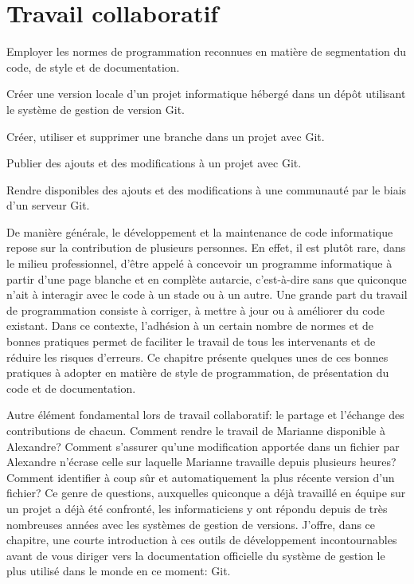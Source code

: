
\chapter{Travail collaboratif}
\label{chap:collaboration}

\begin{objectifs}
\item Employer les normes de programmation reconnues en matière de
  segmentation du code, de style et de documentation.
\item Créer une version locale d'un projet informatique hébergé dans
  un dépôt utilisant le système de gestion de version Git.
\item Créer, utiliser et supprimer une branche dans un projet avec
  Git.
\item Publier des ajouts et des modifications à un projet avec Git.
\item Rendre disponibles des ajouts et des modifications à une
  communauté par le biais d'un serveur Git.
\end{objectifs}

De manière générale, le développement et la maintenance de code
informatique repose sur la contribution de plusieurs personnes. En
effet, il est plutôt rare, dans le milieu professionnel, d'être appelé
à concevoir un programme informatique à partir d'une page blanche et
en complète autarcie, c'est-à-dire sans que quiconque n'ait à
interagir avec le code à un stade ou à un autre. Une grande part du
travail de programmation consiste à corriger, à mettre à jour ou à
améliorer du code existant. Dans ce contexte, l'adhésion à un certain
nombre de normes et de bonnes pratiques permet de faciliter le travail
de tous les intervenants et de réduire les risques d'erreurs. Ce
chapitre présente quelques unes de ces bonnes pratiques à adopter en
matière de style de programmation, de présentation du code et de
documentation.

Autre élément fondamental lors de travail collaboratif: le partage et
l'échange des contributions de chacun. Comment rendre le travail de
Marianne disponible à Alexandre? Comment s'assurer qu'une modification
apportée dans un fichier par Alexandre n'écrase celle sur laquelle
Marianne travaille depuis plusieurs heures? Comment identifier à coup
sûr et automatiquement la plus récente version d'un fichier? Ce genre
de questions, auxquelles quiconque a déjà travaillé en équipe sur un
projet a déjà été confronté, les informaticiens y ont répondu depuis
de très nombreuses années avec les systèmes de gestion de versions.
J'offre, dans ce chapitre, une courte introduction à ces outils de
développement incontournables avant de vous diriger vers la
documentation officielle du système de gestion le plus utilisé dans le
monde en ce moment: Git.


